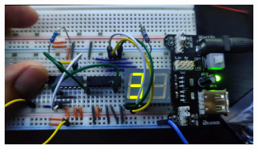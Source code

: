 \documentclass{article}
\begin{document}
\begin{figure}[ht!]
  \centering
  \includegraphics[width=\textwidth]{ECE2300L_Lab11_3.jpg}
\end{figure}
\end{document}
